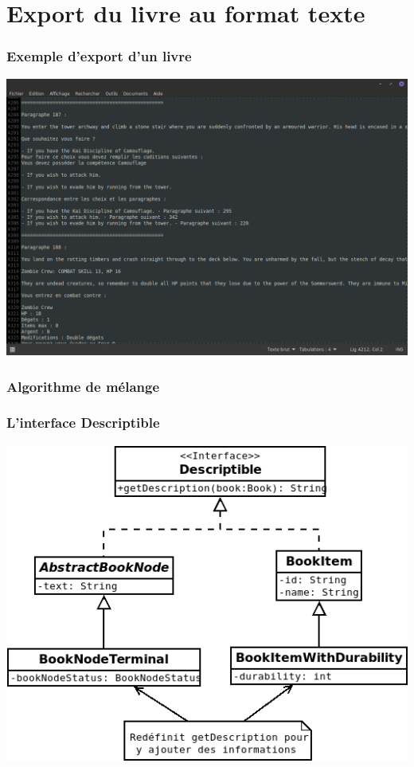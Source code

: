 \documentclass[beamer]{BetterDocument}
\begin{document}
	\section{Export du livre au format texte}
	\begin{frame}
		\frametitle{Exemple d'export d'un livre}

		\center\includegraphics[width=0.8\paperwidth, keepaspectratio]{img/export_txt.png}
	\end{frame}

	\begin{frame}
		\frametitle{Algorithme de mélange}

	\end{frame}

	\begin{frame}
		\frametitle{L'interface \textbf{Descriptible}}

		\center\includegraphics[height=0.7\paperheight, keepaspectratio]{img/descriptible.png}
	\end{frame}
\end{document}
